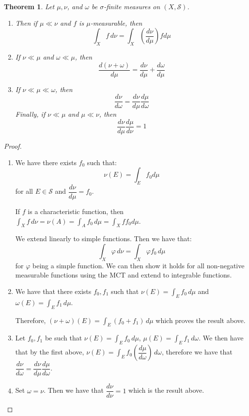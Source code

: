 \documentclass{article}
\newtheorem{theorem}{Theorem}
\theoremstyle{definition}
\numberwithin{theorem}{section}
\numberwithin{equation}{section}
\begin{document}
\begin{theorem}
	Let $\mu, \nu$, and $\omega$ be $\sigma$-finite measures on $(X, \mathcal{S})$.
	\begin{enumerate}
		\item Then if $\mu \ll \nu$ and $f$ is $\mu$-measurable, then
		\begin{equation}
			\int_X f \, d\nu = \int_X (\dfrac{d\nu}{d\mu}) f d\mu
		\end{equation}
		\item If $\nu \ll \mu$ and $\omega \ll \mu$, then
		\begin{equation}
			\dfrac{d(\nu + \omega)}{d\mu} = \dfrac{d\nu}{d\mu} + \dfrac{d\omega}{d\mu}
		\end{equation}
		\item If $\nu \ll \mu \ll \omega$, then
		\begin{equation}
			\dfrac{d\nu}{d\omega} = \dfrac{d\nu}{d\mu} \dfrac{d\mu}{d\omega}
		\end{equation}
		Finally, if $\nu \ll \mu$ and $\mu \ll \nu$, then
		\begin{equation}
			\dfrac{d\nu}{d\mu} \dfrac{d\mu}{d\nu} = 1
		\end{equation}
	\end{enumerate}
\end{theorem}

\begin{proof}
	\begin{enumerate}
		\item 
		We have there exists $f_0$ such that:
		\begin{equation}
			\nu(E) = \int_E f_0 d\mu
		\end{equation}
		for all $E \in \mathcal{S}$ and $\dfrac{d\nu}{d\mu} = f_0$.
		
		If $f$ is a characteristic function, then $\int_X f \, d\nu = \nu(A) = \int_A f_0 \, d\mu = \int_X f f_0 d\mu$. 
		
		We extend linearly to simple functions. 
		Then we have that:
		\begin{equation}
			\int_X \varphi \, d\nu = \int_X \varphi f_0 \, d\mu
		\end{equation}
		for $\varphi$ being a simple function. We can then show it holds for all non-negative measurable functions using the MCT and extend to integrable functions. 
		\item
		We have that there exists $f_0, f_1$ such that $\nu(E) = \int_E f_0 \, d\mu$ and $\omega(E) = \int_E f_1 \, d\mu$. 
		
		Therefore, $(\nu + \omega)(E) = \int_E (f_0 + f_1) \, d\mu$ which proves the result above.
		\item Let $f_0, f_1$ be such that $\nu(E) = \int_E f_0 \, d\mu$, $\mu(E) = \int_E f_1 \, d\omega$. We then have that by the first above,  $\nu(E) = \int_E f_0 (\dfrac{d\mu}{d\omega}) \, d\omega$, therefore we have that $\dfrac{d \nu}{d \omega} = \dfrac{d\nu}{d\mu} \dfrac{d\mu}{d\omega}$. 
		\item Set $\omega = \nu$. Then we have that $\dfrac{d\nu}{d\nu} = 1$ which is the result above. 
	\end{enumerate}
\end{proof}
\end{document}
